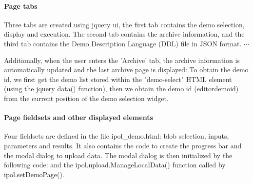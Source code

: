 \paragraph{Page tabs} Three tabs are created using jquery ui, the first tab
contains the demo selection, display and execution. The second tab contains
the archive information, and the third tab contains the Demo Description 
Language (DDL) file in JSON format.
%
$\cdots$
%

Additionally, when the user enters the 'Archive' tab, the archive information
is automatically updated and the last archive page is displayed:
%
To obtain the demo id, we first get the demo list stored within the "demo-select"
HTML element (using the jquery data() function), then we obtain the demo id 
(editordemoid) from the current position of the demo selection widget.

\paragraph{Page fieldsets and other displayed elements}

Four fieldsets are defined in the file ipol\_demo.html: blob selection, inputs, 
parameters and results. It also contains the code to create the progress bar
and the modal dialog to upload data.
The modal dialog is then initialized by the following code:
%
and the ipol.upload.ManageLocalData() function called by ipol.setDemoPage().

